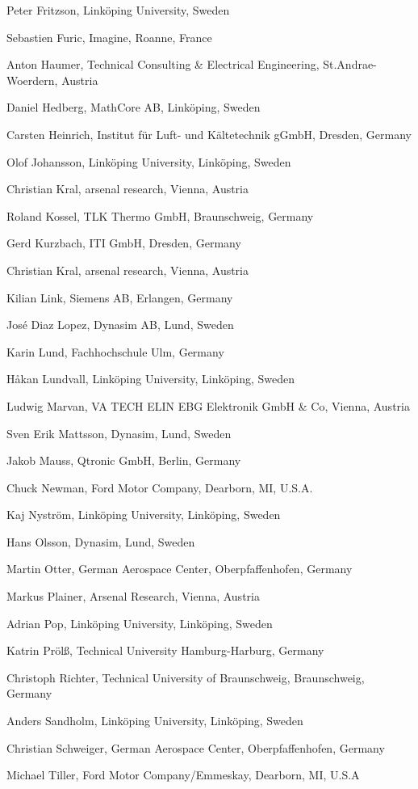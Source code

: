 \documentclass[10pt,a4paper]{report}
\begin{document}
Peter Fritzson, Linköping University, Sweden

Sebastien Furic, Imagine, Roanne, France

Anton Haumer, Technical Consulting \& Electrical Engineering,
St.Andrae-Woerdern, Austria

Daniel Hedberg, MathCore AB, Linköping, Sweden

Carsten Heinrich, Institut für Luft- und Kältetechnik gGmbH, Dresden,
Germany

Olof Johansson, Linköping University, Linköping, Sweden

Christian Kral, arsenal research, Vienna, Austria

Roland Kossel, TLK Thermo GmbH, Braunschweig, Germany

Gerd Kurzbach, ITI GmbH, Dresden, Germany

Christian Kral, arsenal research, Vienna, Austria

Kilian Link, Siemens AB, Erlangen, Germany

José Diaz Lopez, Dynasim AB, Lund, Sweden

Karin Lund, Fachhochschule Ulm, Germany

Håkan Lundvall, Linköping University, Linköping, Sweden

Ludwig Marvan, VA TECH ELIN EBG Elektronik GmbH \& Co, Vienna, Austria

Sven Erik Mattsson, Dynasim, Lund, Sweden

Jakob Mauss, Qtronic GmbH, Berlin, Germany

Chuck Newman, Ford Motor Company, Dearborn, MI, U.S.A.

Kaj Nyström, Linköping University, Linköping, Sweden

Hans Olsson, Dynasim, Lund, Sweden

Martin Otter, German Aerospace Center, Oberpfaffenhofen, Germany

Markus Plainer, Arsenal Research, Vienna, Austria

Adrian Pop, Linköping University, Linköping, Sweden

Katrin Prölß, Technical University Hamburg-Harburg, Germany

Christoph Richter, Technical University of Braunschweig, Braunschweig,
Germany

Anders Sandholm, Linköping University, Linköping, Sweden

Christian Schweiger, German Aerospace Center, Oberpfaffenhofen, Germany

Michael Tiller, Ford Motor Company/Emmeskay, Dearborn, MI, U.S.A
\end{document}
